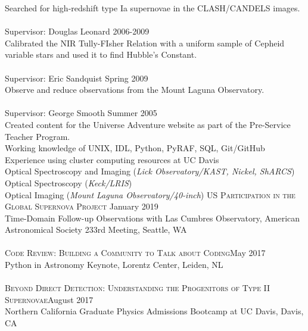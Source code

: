 \documentclass[10pt]{cv}
\begin{document}
\begin{llist}
Searched for high-redshift type Ia supernovae in the CLASH/CANDELS images.\\
\\
Supervisor: Douglas Leonard \hfill 2006-2009 \\
Calibrated the NIR Tully-FIsher Relation with a uniform sample of Cepheid 
variable stars and used it to find Hubble's Constant.\\
\\
Supervisor: Eric Sandquist \hfill Spring 2009\\
Observe and reduce observations from the Mount Laguna Observatory. \\ 
\\
Supervisor: George Smooth \hfill Summer 2005\\
Created content for the Universe Adventure website as part of the 
Pre-Service Teacher Program.\\
\vspace{-0.1in}  
Working knowledge of UNIX, IDL, Python, PyRAF, SQL, Git/GitHub\\
Experience using cluster computing resources at UC Davis\\ 
%
\vspace{-0.1in}   
Optical Spectroscopy and Imaging ({\it Lick Observatory/KAST, Nickel, ShARCS})\\
Optical Spectroscopy ({\it Keck/LRIS})\\
Optical Imaging ({\it Mount Laguna Observatory/40-inch})
\vspace{-0.1in}  
\textsc{US Participation in the Global Supernova Project} \hfill January 2019\\
Time-Domain Follow-up Observations with Las Cumbres Observatory, American Astronomical Society 233rd Meeting, Seattle, WA \\
\\
\textsc{Code Review: Building a Community to Talk about Coding}\hfill May 2017\\
Python in Astronomy Keynote, Lorentz Center, Leiden, NL\\
\\
\textsc{Beyond Direct Detection: Understanding the Progenitors of Type II Supernovae}\hfill August 2017\\
Northern California Graduate Physics Admissions Bootcamp at UC Davis, Davis, CA\\

\end{llist}
\end{document}
